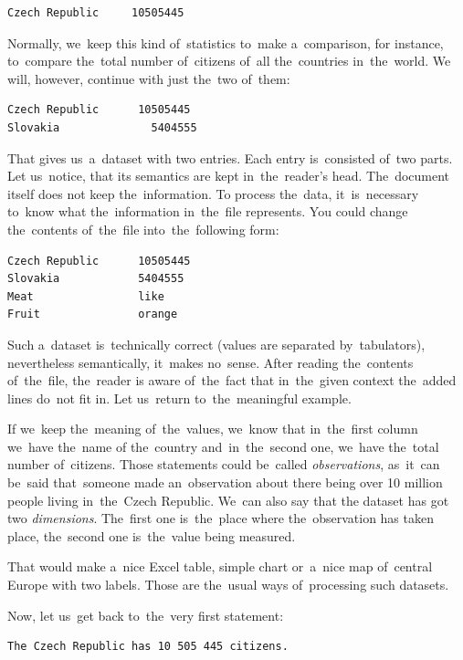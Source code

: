 \begin{verbatim}
Czech Republic     10505445
\end{verbatim}

Normally, we~keep this kind of~statistics to~make a~comparison, 
for instance, to~compare the~total number of~citizens of~all the~countries in~the~world.
We will, however, continue with just the~two of~them:

\begin{verbatim}
Czech Republic	    10505445
Slovakia	          5404555
\end{verbatim}

That gives us~a~dataset with two entries. Each entry is~consisted of~two parts. Let us~notice, that 
its semantics are kept in~the~reader's head. The~document itself does not keep the~information.
To process the~data, it~is~necessary to~know what the~information in~the~file represents. You could change
the~contents of~the~file into~the~following form:

\begin{verbatim}
Czech Republic      10505445
Slovakia            5404555
Meat                like
Fruit               orange
\end{verbatim}

Such a~dataset is~technically correct (values are separated by~tabulators), nevertheless 
semantically, it~makes no~sense. After reading the~contents of~the~file, the~reader 
is aware of~the~fact that in~the~given context the~added lines do~not fit in.
Let us~return to~the~meaningful example.

If we~keep the~meaning of~the~values, we~know that in~the~first column we~have the~name
of the~country and~in~the~second one, we~have the~total number of~citizens. Those statements
could be~called \emph{observations}, as~it~can be~said that~someone made an~observation 
about there being over 10 million people living in~the~Czech Republic. We~can also say that the
dataset has got two \emph{dimensions}. The~first one is~the~place where the~observation has taken
place, the~second one is~the~value being measured.

That would make a~nice Excel table, simple chart or~a~nice map of~central Europe with
two labels. Those are the~usual ways of~processing such datasets.

Now, let us~get back to~the~very first statement:

\begin{verbatim}
The Czech Republic has 10 505 445 citizens.
\end{verbatim}

